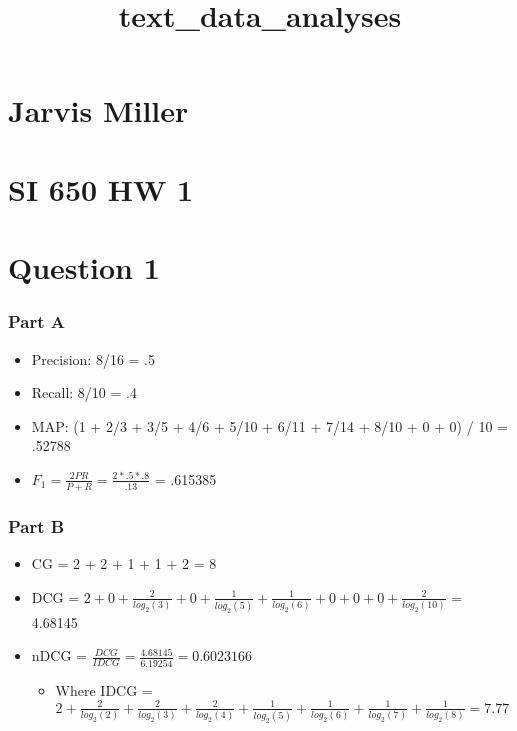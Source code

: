 \documentclass[11pt]{article}
\title{text\_data\_analyses}
\providecommand{\tightlist}{%
      \setlength{\itemsep}{0pt}\setlength{\parskip}{0pt}}
\begin{document}
    
    
    \maketitle
    
    

    
    \section{Jarvis Miller}\label{jarvis-miller}

\section{SI 650 HW 1}\label{si-650-hw-1}

    \section{Question 1}\label{question-1}

    \subsubsection{Part A}\label{part-a}

\begin{itemize}
\tightlist
\item
  Precision: 8/16 = .5
\item
  Recall: 8/10 = .4
\item
  MAP: (1 + 2/3 + 3/5 + 4/6 + 5/10 + 6/11 + 7/14 + 8/10 + 0 + 0) / 10 =
  .52788
\item
  \(F_{1} = \frac{2PR}{P+R} = \frac{2*.5*.8}{.13}\) = .615385
\end{itemize}

    \subsubsection{Part B}\label{part-b}

\begin{itemize}
\tightlist
\item
  CG = 2 + 2 + 1 + 1 + 2 = 8
\item
  DCG =
  \(2 + 0 + \frac{2}{log_{2}(3)} + 0 + \frac{1}{log_{2}(5)} + \frac{1}{log_{2}(6)} + 0 + 0 + 0 + \frac{2}{log_{2}(10)}\)
  = 4.68145
\item
  nDCG = \(\frac{DCG}{IDCG} = \frac{4.68145}{6.19254} = 0.6023166\)

  \begin{itemize}
  \tightlist
  \item
    Where IDCG =
    \(2 + \frac{2}{log_{2}(2)} + \frac{2}{log_{2}(3)} + \frac{2}{log_{2}(4)} + \frac{1}{log_{2}(5)}+ \frac{1}{log_{2}(6)} + \frac{1}{log_{2}(7)} + \frac{1}{log_{2}(8)} = 7.77\)
  \end{itemize}
\end{itemize}
\end{document}
